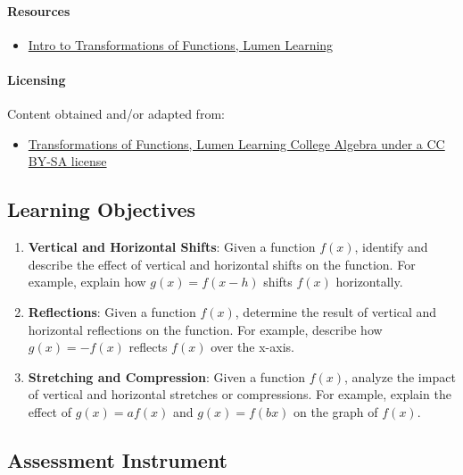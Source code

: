 \paragraph{Resources}

\begin{itemize}
    \item \href{https://courses.lumenlearning.com/wmopen-collegealgebra/chapter/introduction-transformations-of-functions/}{Intro to Transformations of Functions, Lumen Learning}
\end{itemize}

\paragraph{Licensing}

Content obtained and/or adapted from:

\begin{itemize}
    \item \href{https://courses.lumenlearning.com/wmopen-collegealgebra/chapter/introduction-transformations-of-functions/}{Transformations of Functions, Lumen Learning College Algebra under a CC BY-SA license}
\end{itemize}

\subsection{Learning Objectives}

\begin{enumerate}
    \item \textbf{Vertical and Horizontal Shifts}: Given a function $f(x)$, identify and describe the effect of vertical and horizontal shifts on the function. For example, explain how $g(x) = f(x - h)$ shifts $f(x)$ horizontally.
    \item \textbf{Reflections}: Given a function $f(x)$, determine the result of vertical and horizontal reflections on the function. For example, describe how $g(x) = -f(x)$ reflects $f(x)$ over the x-axis.
    \item \textbf{Stretching and Compression}: Given a function $f(x)$, analyze the impact of vertical and horizontal stretches or compressions. For example, explain the effect of $g(x) = af(x)$ and $g(x) = f(bx)$ on the graph of $f(x)$.
\end{enumerate}

\subsection{Assessment Instrument}

